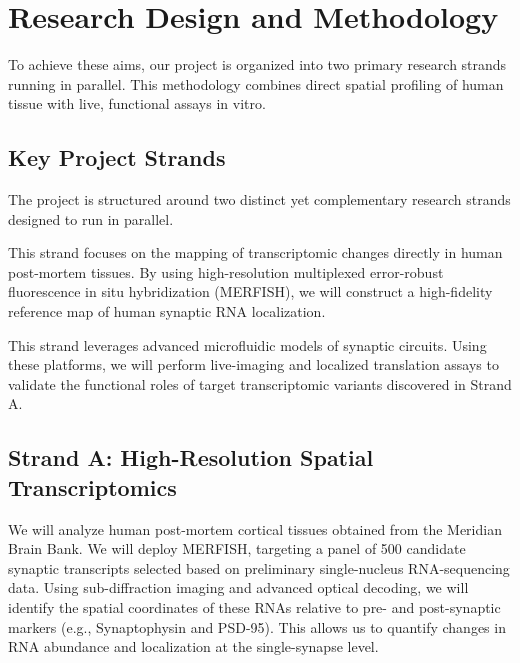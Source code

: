 \section{Research Design and Methodology}

To achieve these aims, our project is organized into two primary research strands running in parallel. This methodology combines direct spatial profiling of human tissue with live, functional assays in vitro.

\subsection{Key Project Strands}

The project is structured around two distinct yet complementary research strands designed to run in parallel.

\noindent
\begin{minipage}[t]{0.48\textwidth}
    \begin{tcolorbox}[
        enhanced,
        title=\sffamily\bfseries Strand A: Spatial Profiling,
        colback=bgcolor,
        colframe=primarycolor,
        coltitle=white,
        arc=4pt,
        boxrule=1.5pt,
        height=4.0cm
    ]
        \small
        This strand focuses on the mapping of transcriptomic changes directly in human post-mortem tissues. By using high-resolution multiplexed error-robust fluorescence in situ hybridization (MERFISH), we will construct a high-fidelity reference map of human synaptic RNA localization.
    \end{tcolorbox}
\end{minipage}%
\hfill
\begin{minipage}[t]{0.48\textwidth}
    \begin{tcolorbox}[
        enhanced,
        title=\sffamily\bfseries Strand B: Functional Validation,
        colback=bgcolor,
        colframe=secondarycolor,
        coltitle=white,
        arc=4pt,
        boxrule=1.5pt,
        height=4.0cm
    ]
        \small
        This strand leverages advanced microfluidic models of synaptic circuits. Using these platforms, we will perform live-imaging and localized translation assays to validate the functional roles of target transcriptomic variants discovered in Strand A.
    \end{tcolorbox}
\end{minipage}

\subsection{Strand A: High-Resolution Spatial Transcriptomics}
We will analyze human post-mortem cortical tissues obtained from the Meridian Brain Bank. We will deploy MERFISH, targeting a panel of 500 candidate synaptic transcripts selected based on preliminary single-nucleus RNA-sequencing data. Using sub-diffraction imaging and advanced optical decoding, we will identify the spatial coordinates of these RNAs relative to pre- and post-synaptic markers (e.g., Synaptophysin and PSD-95). This allows us to quantify changes in RNA abundance and localization at the single-synapse level.

